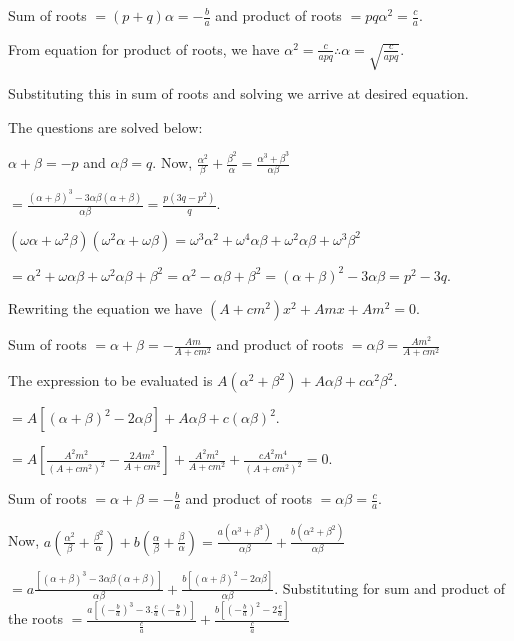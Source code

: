   Sum of roots $= (p + q)\alpha = -\frac{b}{a}$ and product of roots $= pq\alpha^2 = \frac{c}{a}$.

  From equation for product of roots, we have $\alpha^2 = \frac{c}{apq} \therefore \alpha = \sqrt{\frac{c}{apq}}$.

  Substituting this in sum of roots and solving we arrive at desired equation.
\item The questions are solved below:
  \startitemize[i]
  \item $\alpha + \beta = -p$ and $\alpha\beta = q$. Now, $\frac{\alpha^2}{\beta} + \frac{\beta^2}{\alpha} =
    \frac{\alpha^3 + \beta^3}{\alpha\beta}$

    $= \frac{(\alpha + \beta)^3 - 3\alpha\beta(\alpha + \beta)}{\alpha\beta} = \frac{p(3q - p^2)}{q}$.
  \item $(\omega\alpha + \omega^2\beta)(\omega^2\alpha + \omega\beta) = \omega^3\alpha^2 +
    \omega^4\alpha\beta + \omega^2\alpha\beta + \omega^3\beta^2$

    $= \alpha^2 + \omega\alpha\beta + \omega^2\alpha\beta + \beta^2 = \alpha^2 -\alpha\beta + \beta^2 =
    (\alpha + \beta)^2 - 3\alpha\beta = p^2 - 3q$.
  \stopitemize
\item Rewriting the equation we have $(A + cm^2)x^2 + Amx + Am^2 = 0$.

  Sum of roots $= \alpha + \beta = -\frac{Am}{A + cm^2}$ and product of roots $= \alpha\beta = \frac{Am^2}{A + cm^2}$

  The expression to be evaluated is $A(\alpha^2 + \beta^2) + A\alpha\beta + c\alpha^2\beta^2$.

  $= A[(\alpha + \beta)^2 - 2\alpha\beta] + A\alpha\beta + c(\alpha\beta)^2$.

  $= A\left[\frac{A^2m^2}{(A + cm^2)^2} - \frac{2Am^2}{A + cm^2}\right] + \frac{A^2m^2}{A + cm^2} + \frac{cA^2m^4}{(A +
    cm^2)^2} = 0$.
\item Sum of roots $= \alpha + \beta = -\frac{b}{a}$ and product of roots $= \alpha\beta = \frac{c}{a}$.

  Now, $a\left(\frac{\alpha^2}{\beta} + \frac{\beta^2}{\alpha}\right) + b\left(\frac{\alpha}{\beta} +
  \frac{\beta}{\alpha}\right) = \frac{a(\alpha^3 + \beta^3)}{\alpha\beta} + \frac{b(\alpha^2 +
    \beta^2)}{\alpha\beta}$

  $= a\frac{[(\alpha + \beta)^3 - 3\alpha\beta(\alpha + \beta)]}{\alpha\beta} + \frac{b[(\alpha + \beta)^2 -
      2\alpha\beta]}{\alpha\beta}$. Substituting for sum and product of the roots $=
  \frac{a\left[\left(-\frac{b}{a}\right)^3 - 3.\frac{c}{a}\left(-\frac{b}{a}\right)\right]}{\frac{c}{a}} +
  \frac{b\left[\left(-\frac{b}{a}\right)^2 -2 \frac{c}{a}\right]}{\frac{c}{a}}$

